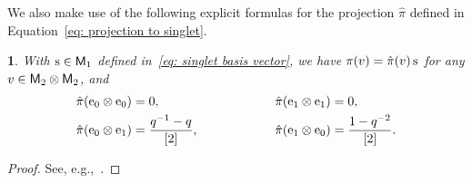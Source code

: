 \documentclass[oneside,english]{amsart}
\numberwithin{equation}{section}
\numberwithin{figure}{section}
\theoremstyle{plain}
\theoremstyle{plain}
\theoremstyle{plain}
\newtheorem{lem}{\protect\lemmaname}
\theoremstyle{remark}
\theoremstyle{plain}
\theoremstyle{plain}
\theoremstyle{plain}
\theoremstyle{plain}
\theoremstyle{plain}
\theoremstyle{plain}
\theoremstyle{plain}
\theoremstyle{plain}
\providecommand{\lemmaname}{Lemma}
\begin{document}

We %
also make use of the following explicit formulas for the projection $\hat{\pi}$ defined in Equation~\eqref{eq: projection to singlet}.

\begin{lem}
\label{lem: projection formulas}
With $\mathrm{s} \in \mathsf{M}_1$ defined in~\eqref{eq: singlet basis vector},
we have $\pi(v)=\hat{\pi}(v) \, \mathrm{s}$ for any $v\in\mathsf{M}_{2}\otimes\mathsf{M}_{2}$, and
\begin{align*}
&\hat{\pi}(\mathrm{e}_{0}\otimes\mathrm{e}_{0})=0,\qquad\qquad\quad\qquad\qquad\hat{\pi}(\mathrm{e}_{1}\otimes\mathrm{e}_{1})=0,\\
&\hat{\pi}(\mathrm{e}_{0}\otimes\mathrm{e}_{1})=\frac{q^{-1}-q}{\left[2\right]},\qquad\qquad\qquad\hat{\pi}(\mathrm{e}_{1}\otimes\mathrm{e}_{0})=\frac{1-q^{-2}}{\left[2\right]}.
\end{align*}
\end{lem}
\begin{proof}
See, e.g.,~\cite[Lemma~2.3]{KP-pure_partition_functions_of_multiple_SLEs}.
\end{proof}

\end{document}
